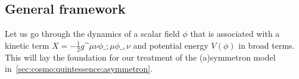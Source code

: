 \subsection{General framework}\label{sec:cosmo:quintessence:framework}
    Let us go through the dynamics of a scalar field $\phi$ that is associated with a kinetic term $X=- \frac{1}{2} g\^{\mu\nu} \phi\_{;\mu}\phi\_{,\nu}$ and potential energy $V(\phi)$ in broad terms. This will lay the foundation for our treatment of the (a)symmetron model in~\cref{sec:cosmo:quintessence:asymmetron}.




